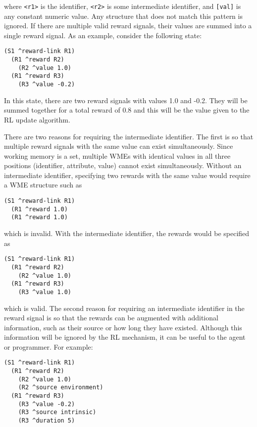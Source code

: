 where \verb=<r1>= is the  identifier, \verb=<r2>= is some intermediate identifier, and \verb=[val]= is any constant numeric value.
Any structure that does not match this pattern is ignored.
If there are multiple valid reward signals, their values are summed into a single reward signal.
As an example, consider the following state:

\begin{verbatim}
(S1 ^reward-link R1)
  (R1 ^reward R2)
    (R2 ^value 1.0)
  (R1 ^reward R3)
    (R3 ^value -0.2)
\end{verbatim}

In this state, there are two reward signals with values 1.0 and -0.2.
They will be summed together for a total reward of 0.8 and this will be the value given to the RL update algorithm.

There are two reasons for requiring the intermediate identifier.
The first is so that multiple reward signals with the same value can exist simultaneously.
Since working memory is a set, multiple WMEs with identical values in all three positions (identifier, attribute, value) cannot exist simultaneously.
Without an intermediate identifier, specifying two rewards with the same value would require a WME structure such as

\begin{verbatim}
(S1 ^reward-link R1)
  (R1 ^reward 1.0)
  (R1 ^reward 1.0)
\end{verbatim}

which is invalid. With the intermediate identifier, the rewards would be specified as

\begin{verbatim}
(S1 ^reward-link R1)
  (R1 ^reward R2)
    (R2 ^value 1.0)
  (R1 ^reward R3)
    (R3 ^value 1.0)
\end{verbatim}

which is valid.
The second reason for requiring an intermediate identifier in the reward signal is so that the rewards can be augmented with additional information, such as their source or how long they have existed.
Although this information will be ignored by the RL mechanism, it can be useful to the agent or programmer.
For example:

\begin{verbatim}
(S1 ^reward-link R1)
  (R1 ^reward R2)
    (R2 ^value 1.0)
    (R2 ^source environment)
  (R1 ^reward R3)
    (R3 ^value -0.2)
    (R3 ^source intrinsic)
    (R3 ^duration 5)
\end{verbatim}

